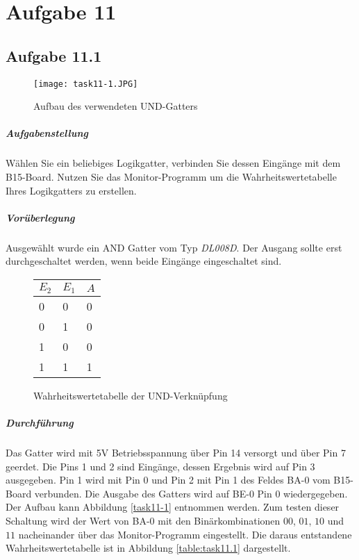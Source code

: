 \chapter{Aufgabe 11}
\section{Aufgabe 11.1}

\begin{wrapfigure}[21]{r}{.4\textwidth}
	\texttt{[image: task11-1.JPG]}
	\caption{Aufbau des verwendeten UND-Gatters}
	\label{task11-1}
\end{wrapfigure}

\paragraph{Aufgabenstellung}
Wählen Sie ein beliebiges Logikgatter, verbinden Sie dessen Eingänge mit dem B15-Board. Nutzen Sie das Monitor-Programm um die Wahrheitswertetabelle Ihres Logikgatters zu erstellen.

\paragraph{Vorüberlegung}
Ausgewählt wurde ein AND Gatter vom Typ \textit{DL008D}. Der Ausgang sollte erst durchgeschaltet werden, wenn beide Eingänge eingeschaltet sind.

\begin{wrapfigure}[2]{r}{.4\textwidth}
	\centering
	\begin{tabular}{|l|l|l|}
		\hline
		\textbf{$E_2$} & \textbf{$E_1$} & \textbf{$A$} \\ \hline\hline
		0          & 0          & 0          \\ \hline
		0          & 1          & 0          \\ \hline
		1          & 0          & 0          \\ \hline
		1          & 1          & 1          \\ \hline
	\end{tabular}
	\caption{Wahrheitswertetabelle der UND-Verknüpfung}
	\label{table:task11.1}
\end{wrapfigure}

\paragraph{Durchführung}
Das Gatter wird mit 5V Betriebsspannung über Pin 14 versorgt und über Pin 7 geerdet. Die Pins 1 und 2 sind Eingänge, dessen Ergebnis wird auf Pin 3 ausgegeben. Pin 1 wird mit Pin 0 und Pin 2 mit Pin 1 des Feldes BA-0 vom B15-Board verbunden. Die Ausgabe des Gatters wird auf BE-0 Pin 0 wiedergegeben. Der Aufbau kann Abbildung \vref{task11-1} entnommen werden. Zum testen dieser Schaltung wird der Wert von BA-0 mit den Binärkombinationen $00$, $01$, $10$ und $11$ nacheinander über das Monitor-Programm eingestellt. Die daraus entstandene Wahrheitswertetabelle ist in Abbildung \vref{table:task11.1} dargestellt.

